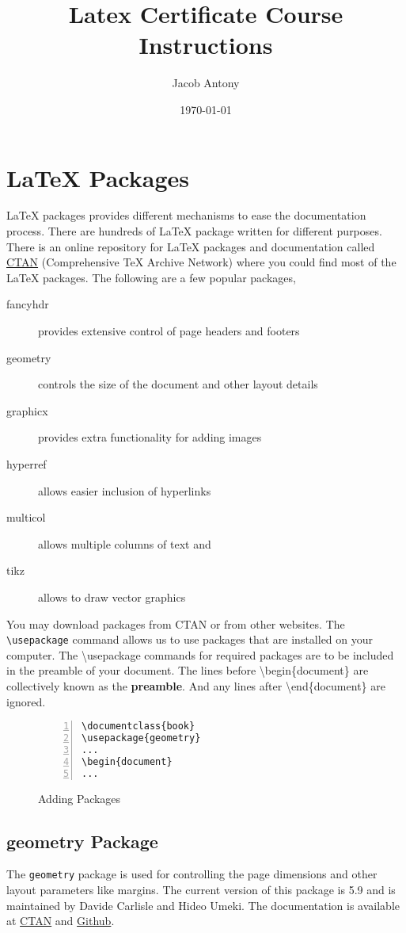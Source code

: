 \documentclass{article}
\title{Latex Certificate Course Instructions}
\author{Jacob Antony}
\date{\today}
\begin{document}
\maketitle

\section{\LaTeX{} Packages}
	\LaTeX{} packages provides different mechanisms to ease the documentation process. There are hundreds of \LaTeX{} package written for different purposes. There is an online repository for \LaTeX{} packages and documentation called \href{https://ctan.org/pkg}{CTAN} (Comprehensive TeX Archive Network) where you could find most of the \LaTeX{} packages. The following are a few popular packages,

\begin{description}
	\item[fancyhdr] provides extensive control of page headers and footers
	\item[geometry] controls the size of the document and other layout details
	\item[graphicx] provides extra functionality for adding images
	\item[hyperref] allows easier inclusion of hyperlinks
	\item[multicol] allows multiple columns of text and
	\item[tikz] allows to draw vector graphics
\end{description}

	You may download packages from CTAN or from other websites. The \texttt{\textbackslash usepackage} command allows us to use packages that are installed on your computer. The \textbackslash usepackage commands for required packages are to be included in the preamble of your document. The lines before \textbackslash begin\{document\} are collectively known as the \textbf{preamble}. And any lines after \textbackslash end\{document\} are ignored.

\begin{figure}[h]
\centering
\begin{Verbatim}[numbers = left]
\documentclass{book}
\usepackage{geometry}
...
\begin{document}
...
\end{Verbatim}
\caption{Adding Packages}
\end{figure}

\subsection{geometry Package}
	The \texttt{geometry} package is used for controlling the page dimensions and other layout parameters like margins. The current version of this package is 5.9 and is maintained by Davide Carlisle and Hideo Umeki. The documentation is available at \href{https://ctan.org/pkg/geometry}{CTAN} and \href{https://github.com/davidcarlisle/geometry}{Github}.
\end{document}
